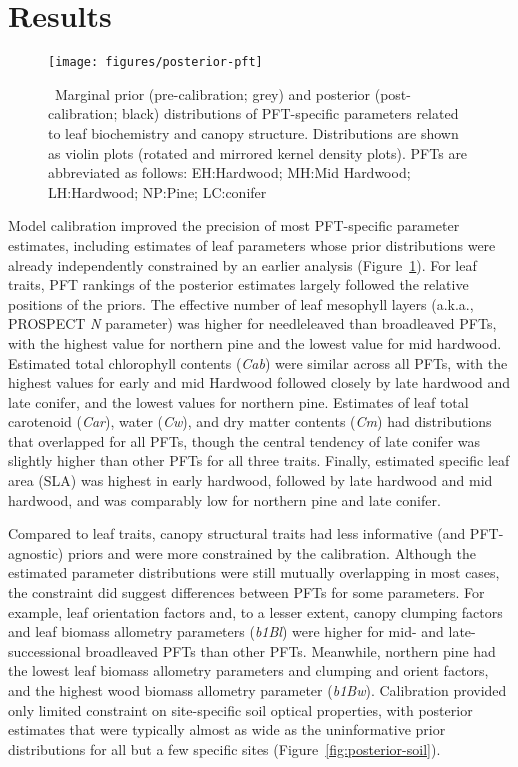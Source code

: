 \section{Results}

\begin{figure}
  \centering
  \texttt{[image: figures/posterior-pft]}
  \caption{\label{fig:posterior-pft}\
    Marginal prior (pre-calibration; grey) and posterior (post-calibration; black) distributions of PFT-specific parameters
    related to leaf biochemistry and canopy structure.
    Distributions are shown as violin plots (rotated and mirrored kernel density plots).
    PFTs are abbreviated as follows:
    EH:\@Early Hardwood;
    MH:\@North Mid Hardwood;
    LH:\@Late Hardwood;
    NP:\@Northern Pine;
    LC:\@Late conifer
  }
\end{figure}

Model calibration improved the precision of most PFT-specific parameter estimates, including estimates of leaf parameters whose prior distributions were already independently constrained by an earlier analysis (Figure~\ref{fig:posterior-pft}).
For leaf traits, PFT rankings of the posterior estimates largely followed the relative positions of the priors.
The effective number of leaf mesophyll layers (a.k.a., PROSPECT \emph{N} parameter) was higher for needleleaved than broadleaved PFTs, with the highest value for northern pine and the lowest value for mid hardwood.
Estimated total chlorophyll contents (\emph{Cab}) were similar across all PFTs, with the highest values for early and mid Hardwood followed closely by late hardwood and late conifer, and the lowest values for northern pine.
Estimates of leaf total carotenoid (\emph{Car}), water (\emph{Cw}), and dry matter contents (\emph{Cm}) had distributions that overlapped for all PFTs, though the central tendency of late conifer was slightly higher than other PFTs for all three traits.
Finally, estimated specific leaf area (SLA) was highest in early hardwood, followed by late hardwood and mid hardwood, and was comparably low for northern pine and late conifer.

Compared to leaf traits, canopy structural traits had less informative (and PFT-agnostic) priors and were more constrained by the calibration.
Although the estimated parameter distributions were still mutually overlapping in most cases, the constraint did suggest differences between PFTs for some parameters.
For example, leaf orientation factors and, to a lesser extent, canopy clumping factors and leaf biomass allometry parameters (\emph{b1Bl}) were higher for mid- and late-successional broadleaved PFTs than other PFTs.
Meanwhile, northern pine had the lowest leaf biomass allometry parameters and clumping and orient factors, and the highest wood biomass allometry parameter (\emph{b1Bw}).
Calibration provided only limited constraint on site-specific soil optical properties, with posterior estimates that were typically almost as wide as the uninformative prior distributions for all but a few specific sites (Figure~\ref{fig:posterior-soil}).

